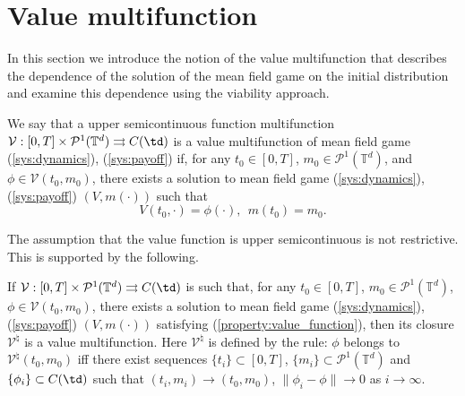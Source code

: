 \documentclass[a4paper,12pt]{article}
\newcommand{\ptd}{\mathcal{P}^1(\mathbb{T}^d)}
\begin{document}
\section{Value multifunction}\label{sect:value_multifunction}

In this section we introduce the notion of the value multifunction that describes the dependence of the solution of the mean field game on the initial distribution and examine this dependence using the viability approach.

\begin{definition}\label{def:value_multifunction}
	We say that a upper semicontinuous function multifunction $\mathcal{V}:[0,T]\times\ptd\rightrightarrows C(\td)$ is a value multifunction of mean field game (\ref{sys:dynamics}), (\ref{sys:payoff}) if,  for any $t_0\in [0,T]$, $m_0\in\ptd$, and $\phi\in \mathcal{V}(t_0,m_0)$, there exists a  solution to mean field game (\ref{sys:dynamics}), (\ref{sys:payoff}) $(V,m(\cdot))$ such that
	\begin{equation}\label{property:value_function}
	V(t_0,\cdot)=\phi(\cdot),\ \ m(t_0)=m_0. 
	\end{equation}
\end{definition}
The assumption that the value function is upper semicontinuous is not restrictive. This is supported by the following. 
\begin{proposition}\label{prop:value_limit}
	If $\mathcal{V}:[0,T]\times\ptd\rightrightarrows C(\td)$ is such that, for any $t_0\in [0,T]$, $m_0\in\ptd$, $\phi\in\mathcal{V}(t_0,m_0)$, there exists a solution to mean field game (\ref{sys:dynamics}), (\ref{sys:payoff}) $(V,m(\cdot))$ satisfying (\ref{property:value_function}), then its closure $\mathcal{V}^\natural$ is a value multifunction. Here $\mathcal{V}^\natural$ is defined by the rule: $\phi$ belongs to $\mathcal{V}^\natural(t_0,m_0)$ iff there exist sequences $\{t_i\}\subset [0,T]$, $\{m_i\}\subset\ptd$ and $\{\phi_i\}\subset C(\td)$ such that $(t_i,m_i)\rightarrow (t_0,m_0)$, $\|\phi_i-\phi\|\rightarrow 0$ as $i\rightarrow\infty$.
\end{proposition} 
\end{document}
